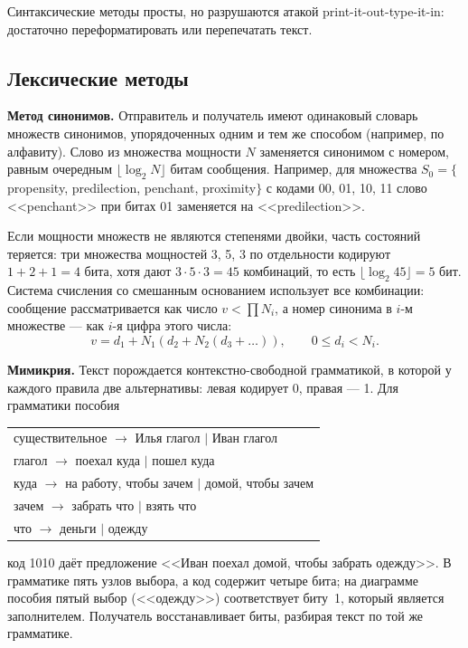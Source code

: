 \documentclass[14pt,a4paper]{extarticle}
\begin{document}
Синтаксические методы просты, но разрушаются атакой print-it-out-type-it-in:
достаточно переформатировать или перепечатать текст.

\subsection{Лексические методы}

\textbf{Метод синонимов.} Отправитель и получатель имеют одинаковый словарь множеств
синонимов, упорядоченных одним и тем же способом (например, по алфавиту). Слово из
множества мощности $N$ заменяется синонимом с номером, равным очередным
$\lfloor \log_2 N \rfloor$ битам сообщения. Например, для множества
$S_0 = \{$propensity, predilection, penchant, proximity$\}$ с кодами 00, 01, 10, 11 слово
<<penchant>> при битах 01 заменяется на <<predilection>>.

Если мощности множеств не являются степенями двойки, часть состояний теряется: три
множества мощностей 3, 5, 3 по отдельности кодируют $1 + 2 + 1 = 4$ бита, хотя дают
$3 \cdot 5 \cdot 3 = 45$ комбинаций, то есть $\lfloor \log_2 45 \rfloor = 5$ бит.
Система счисления со смешанным основанием использует все комбинации: сообщение
рассматривается как число $v < \prod N_i$, а номер синонима в $i$-м множестве --- как
$i$-я цифра этого числа:
\begin{equation}
v = d_1 + N_1 (d_2 + N_2 (d_3 + \ldots)), \qquad 0 \le d_i < N_i.
\end{equation}

\textbf{Мимикрия.} Текст порождается контекстно-свободной грамматикой, в которой у
каждого правила две альтернативы: левая кодирует 0, правая --- 1. Для грамматики
пособия
\begin{center}
\begin{tabular}{l}
существительное $\to$ Илья глагол $\mid$ Иван глагол \\
глагол $\to$ поехал куда $\mid$ пошел куда \\
куда $\to$ на работу, чтобы зачем $\mid$ домой, чтобы зачем \\
зачем $\to$ забрать что $\mid$ взять что \\
что $\to$ деньги $\mid$ одежду
\end{tabular}
\end{center}
код 1010 даёт предложение <<Иван поехал домой, чтобы забрать одежду>>. В грамматике
пять узлов выбора, а код содержит четыре бита; на диаграмме пособия пятый выбор
(<<одежду>>) соответствует биту~1, который является заполнителем. Получатель
восстанавливает биты, разбирая текст по той же грамматике.
\end{document}
